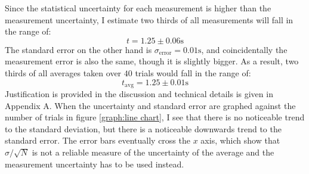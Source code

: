 \documentclass[%
 reprint,
 amsmath,amssymb,
 aps,
]{revtex4-2}
\begin{document}
Since the statistical uncertainty for each measurement is higher than the measurement uncertainty, I estimate two thirds of all measurements will fall in the range of:
\begin{equation}
    t = 1.25 \pm 0.06 \si{\second}
    \label{eq:}
\end{equation}
The standard error on the other hand is $\sigma_\text{error} = 0.01\si{\second}$, and coincidentally the measurement error is also the same, though it is slightly bigger. As a result, two thirds of all averages taken over $40$ trials would fall in the range of:
\begin{equation}
    t_\text{avg} = 1.25 \pm 0.01 \si{\second}
    \label{eq:}
\end{equation}
Justification is provided in the discussion and technical details is given in Appendix A. When the uncertainty and standard error are graphed against the number of trials in figure \ref{graph:line chart}, I see that there is no noticeable trend to the standard deviation, but there is a noticeable downwards trend to the standard error. The error bars eventually cross the $x$ axis, which show that $\sigma/\sqrt{N}$ is not a reliable measure of the uncertainty of the average and the measurement uncertainty has to be used instead.
\end{document}
